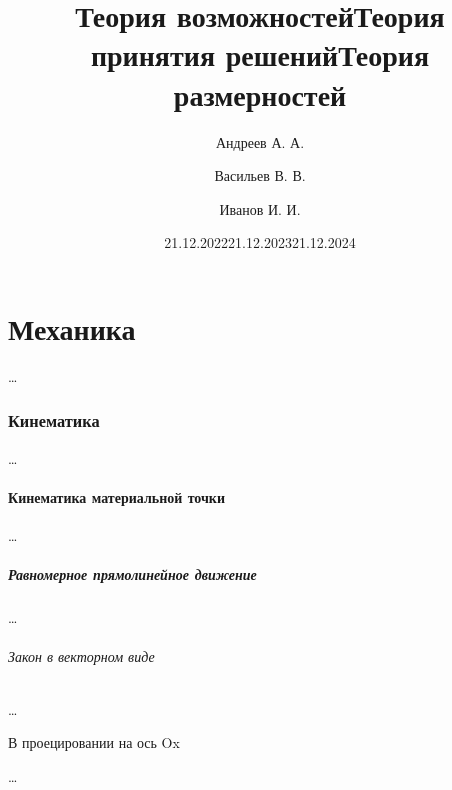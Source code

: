 \documentclass[a4paper, 12pt]{article}
\begin{document}
    \title{Теория возможностей} %
    \title{Теория принятия решений} %
    \title{Теория размерностей} %
    \author{Андреев А. А.} %
    \author{Васильев В. В.} %
    \author{Иванов И. И.} %
    \date{21.12.2022} %
    \date{21.12.2023} %
    \date{21.12.2024} %
    \maketitle

    \tableofcontents
    \newpage

    \part{Механика} %
        \dots
        \section{Кинематика} %
            \dots
            \subsection{Кинематика материальной точки} %
                \dots
                \subsubsection{Равномерное прямолинейное движение} %
                    \dots
                    \paragraph{Закон в векторном виде} %
                        \dots
                        \subparagraph{В проецировании на ось Ox} %
                            \dots
        \newpage
\end{document}
